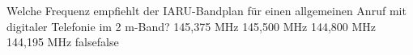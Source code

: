    {Welche Frequenz empfiehlt der IARU-Bandplan für einen allgemeinen Anruf mit digitaler Telefonie im 2 m-Band?}
    {145,375 MHz}
    {145,500 MHz}
    {144,800 MHz}
    {144,195 MHz}
    {false}{false}